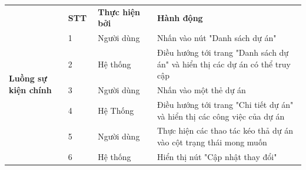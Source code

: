 \documentclass[../DoAn.tex]{subfiles}
\begin{document}
\begin{table}[ht]
\begin{tabular}{| p{0.2\linewidth} | p{0.1\linewidth} | p{0.2\linewidth} | p{0.5\linewidth} |}
        \multirow{12}{\linewidth}{\textbf{Luồng sự kiện chính}}      & \multicolumn{1}{p{0.1\linewidth}|}{\textbf{STT}}                                               & \multicolumn{1}{p{0.2\linewidth}|}{\textbf{Thực hiện bởi}} & \multicolumn{1}{p{0.5\linewidth}|}{\textbf{Hành động}}                                                                         \\ \cline{2-4}
                                                                     & \multicolumn{1}{p{0.1\linewidth}|}{1}                                                          & \multicolumn{1}{p{0.2\linewidth}|}{Người dùng}             & \multicolumn{1}{p{0.5\linewidth}|}{Nhấn vào nút "Danh sách dự án"}                                                             \\ \cline{2-4}
                                                                     & \multicolumn{1}{p{0.1\linewidth}|}{2}                                                          & \multicolumn{1}{p{0.2\linewidth}|}{Hệ thống}               & \multicolumn{1}{p{0.5\linewidth}|}{Điều hướng tới trang "Danh sách dự án" và hiển thị các dự án có thể truy cập}               \\ \cline{2-4}
                                                                     & \multicolumn{1}{p{0.1\linewidth}|}{3}                                                          & \multicolumn{1}{p{0.2\linewidth}|}{Người dùng}             & \multicolumn{1}{p{0.5\linewidth}|}{Nhấn vào một thẻ dự án}                                                                     \\ \cline{2-4}
                                                                     & \multicolumn{1}{p{0.1\linewidth}|}{4}                                                          & \multicolumn{1}{p{0.2\linewidth}|}{Hệ Thống}               & \multicolumn{1}{p{0.5\linewidth}|}{Điều hướng tới trang "Chi tiết dự án" và hiển thị các công việc của dự án}                  \\ \cline{2-4}
                                                                     & \multicolumn{1}{p{0.1\linewidth}|}{5}                                                          & \multicolumn{1}{p{0.2\linewidth}|}{Người dùng}             & \multicolumn{1}{p{0.5\linewidth}|}{Thực hiện các thao tác kéo thả dự án vào cột trạng thái mong muốn}                          \\ \cline{2-4}
                                                                     & \multicolumn{1}{p{0.1\linewidth}|}{6}                                                          & \multicolumn{1}{p{0.2\linewidth}|}{Hệ thống}               & \multicolumn{1}{p{0.5\linewidth}|}{Hiển thị nút "Cập nhật thay đổi"}                                                           \\ \cline{2-4}

\end{tabular}
\end{table}
\end{document}
